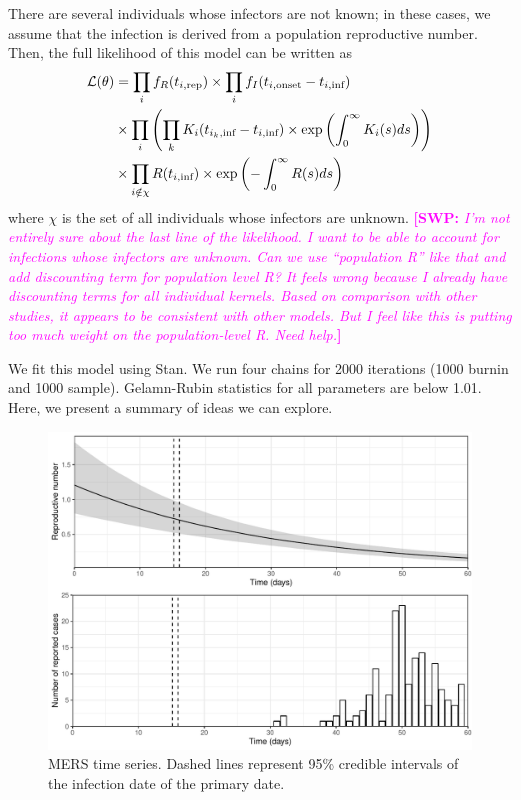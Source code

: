 \documentclass[12pt]{article}
\newcommand{\comment}[3]{\textcolor{#1}{\textbf{[#2: }\textsl{#3}\textbf{]}}}
\newcommand{\swp}[1]{\comment{magenta}{SWP}{#1}}
\begin{document}
There are several individuals whose infectors are not known; in these cases, we assume that the infection is derived from a population reproductive number.
Then, the full likelihood of this model can be written as
\begin{equation}
\begin{aligned}
\mathcal L(\theta) &= \prod_{i}  f_{R}(t_{i, \tiny{\textrm{rep}}}) \times \prod_{i} f_I(t_{i, \tiny{\textrm{onset}}} - t_{i, \tiny{\textrm{inf}}})\\
&\times \prod_{i}\left(\prod_{k} K_i(t_{i_k, \tiny{\textrm{inf}}} - t_{i, \tiny{\textrm{inf}}}) \times \exp \left(\int_0^{\infty} K_i (s) ds\right) \right)\\
&\times \prod_{i \notin \chi} R(t_{i, \tiny{\textrm{inf}}}) \times \exp\left(- \int_0^\infty R(s) ds \right)
\end{aligned}
\end{equation}
where $\chi$ is the set of all individuals whose infectors are unknown.
\swp{I'm not entirely sure about the last line of the likelihood. I want to be able to account for infections whose infectors are unknown. Can we use ``population R'' like that and add discounting term for population level R? It feels wrong because I already have discounting terms for all individual kernels. Based on comparison with other studies, it appears to be consistent with other models. But I feel like this is putting too much weight on the population-level R. Need help.}

We fit this model using Stan.
We run four chains for 2000 iterations (1000 burnin and 1000 sample). 
Gelamn-Rubin statistics for all parameters are below 1.01.
Here, we present a summary of ideas we can explore.

\begin{figure}
\includegraphics[width=\textwidth]{../figure/mers_time_series.pdf}
\caption{MERS time series. Dashed lines represent 95\% credible intervals of the infection date of the primary date.}
\end{figure}
\end{document}
